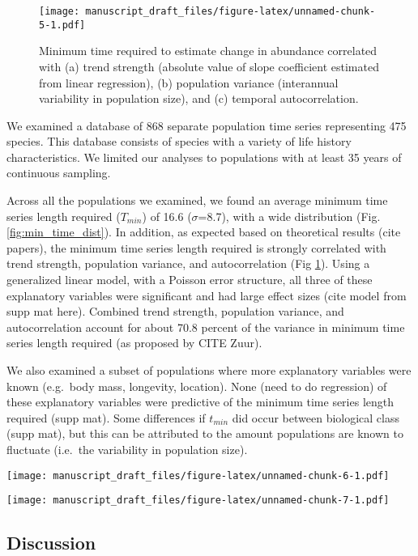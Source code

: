 \documentclass[12pt,]{article}
\begin{document}
\begin{figure}[htbp]
\centering
\texttt{[image: manuscript\_draft\_files/figure-latex/unnamed-chunk-5-1.pdf]}
\caption{Minimum time required to estimate change in abundance
correlated with (a) trend strength (absolute value of slope coefficient
estimated from linear regression), (b) population variance (interannual
variability in population size), and (c) temporal
autocorrelation.\label{fig:correlates}}
\end{figure}

We examined a database of 868 separate population time series
representing 475 species. This database consists of species with a
variety of life history characteristics. We limited our analyses to
populations with at least 35 years of continuous sampling.

Across all the populations we examined, we found an average minimum time
series length required (\(T_{min}\)) of 16.6 (\(\sigma\)=8.7), with a
wide distribution (Fig. \ref{fig:min_time_dist}). In addition, as
expected based on theoretical results (cite papers), the minimum time
series length required is strongly correlated with trend strength,
population variance, and autocorrelation (Fig \ref{fig:correlates}).
Using a generalized linear model, with a Poisson error structure, all
three of these explanatory variables were significant and had large
effect sizes (cite model from supp mat here). Combined trend strength,
population variance, and autocorrelation account for about 70.8 percent
of the variance in minimum time series length required (as proposed by
CITE Zuur).

We also examined a subset of populations where more explanatory
variables were known (e.g.~body mass, longevity, location). None (need
to do regression) of these explanatory variables were predictive of the
minimum time series length required (supp mat). Some differences if
\(t_{min}\) did occur between biological class (supp mat), but this can
be attributed to the amount populations are known to fluctuate (i.e.~the
variability in population size).

\texttt{[image: manuscript\_draft\_files/figure-latex/unnamed-chunk-6-1.pdf]}

\texttt{[image: manuscript\_draft\_files/figure-latex/unnamed-chunk-7-1.pdf]}

\subsection{Discussion}\label{discussion}
\end{document}
